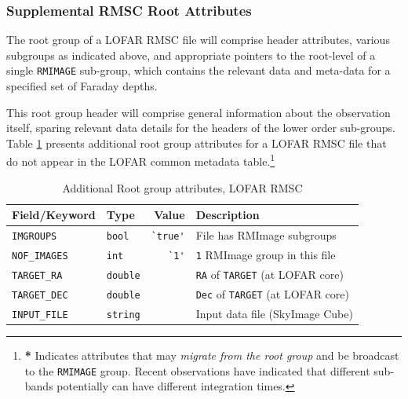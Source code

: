 \documentclass[a4paper,10pt,bibtotoc]{scrartcl}
\begin{document}
\subsubsection{Supplemental RMSC Root Attributes} The root group of a LOFAR RMSC file will comprise header attributes, various subgroups as indicated above, and appropriate pointers to the root-level of a single \verb|RMIMAGE| sub-group, which contains the relevant data and meta-data for a specified set of Faraday depths.

This root group header will comprise general information about the observation itself, sparing relevant data details for the headers of the lower order sub-groups.  Table \ref{tab:attributes root group} presents additional root group attributes for a LOFAR RMSC file that do not appear in the LOFAR common metadata table.\footnote{\textbf{ *} Indicates attributes that may \textit{migrate from the root group} and be broadcast to the \texttt{RMIMAGE} group.  Recent observations have indicated that different sub-bands potentially can have different integration times.}

\begin{table}[htbp]
    \centering
    \begin{tabular}{|llrl|}
        \hline 
        \sc Field/Keyword     & \sc Type      & \sc Value & \sc Description \\
        \hline \hline 
        \small{\verb|IMGROUPS|}      & \verb|bool| & \verb|`true'| & File has RMImage subgroups \\
        \small{\verb|NOF_IMAGES|}  & \verb|int|   & \verb|`1'| & \small{\texttt{1}} RMImage group in this file \\
        \small{\verb|TARGET_RA |}  & \verb|double| &                & \small{\texttt{RA}} of \small{\texttt{TARGET}} (at LOFAR core)\\
        \small{\verb|TARGET_DEC|}  & \verb|double| &                & \small{\texttt{Dec}} of \small{\texttt{TARGET}} (at LOFAR core)\\
        \small{\verb|INPUT_FILE|}  & \verb|string|  &                & Input data file (SkyImage Cube) \\   
        \hline
    \end{tabular}
    \caption{Additional Root group attributes, LOFAR RMSC}
    \label{tab:attributes root group}
\end{table}

\end{document}
